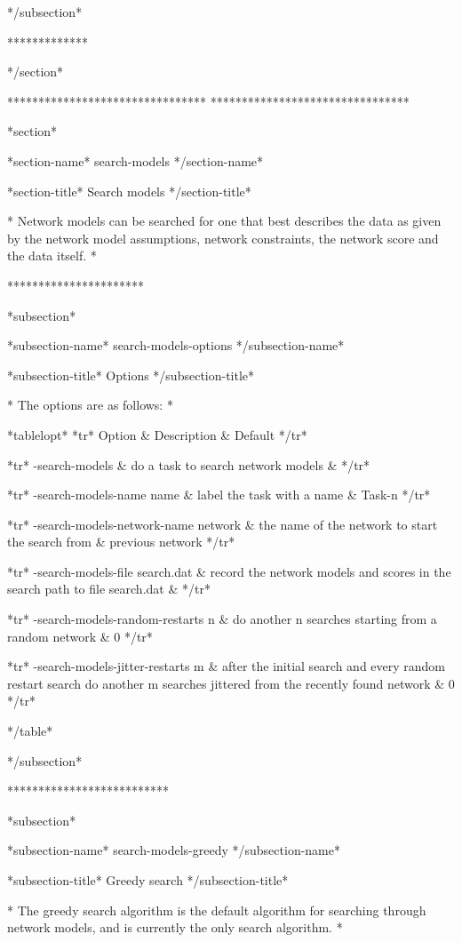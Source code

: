 */subsection*

*************

*/section*

******************************** ********************************

*section*

*section-name* search-models */section-name*

*section-title* Search models */section-title*

* Network models can be searched for one that best describes the data as given by the network model assumptions, network constraints, the network score and the data itself. *

**********************

*subsection*

*subsection-name* search-models-options */subsection-name*

*subsection-title* Options */subsection-title*

* The options are as follows: *

*tablelopt* *tr* Option & Description & Default */tr*

*tr*
 -search-models  & do a task to search network models &
*/tr*

*tr*
  -search-models-name name & label the task with a name & Task-n
*/tr*

*tr*
  -search-models-network-name network & the name of the network to start the search from & previous network
*/tr*

*tr*
  -search-models-file search.dat & record the network models and scores in the search path to file search.dat &
*/tr*

*tr*
  -search-models-random-restarts n & do another n searches starting from a random network & 0
*/tr*

*tr*
  -search-models-jitter-restarts m & after the initial search and every random restart search do another m searches jittered from the recently found network & 0
*/tr*

*/table*

*/subsection*

**************************

*subsection*

*subsection-name* search-models-greedy */subsection-name*

*subsection-title* Greedy search */subsection-title*

* The greedy search algorithm is the default algorithm for searching through network models, and is currently the only search algorithm. *



